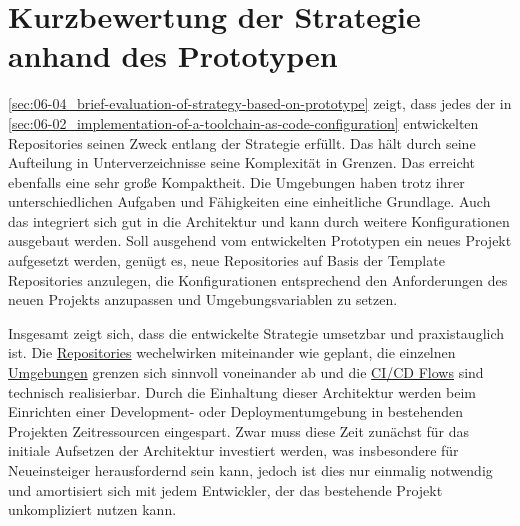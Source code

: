 \section{Kurzbewertung der Strategie anhand des Prototypen}
\label{sec:06-04_brief-evaluation-of-strategy-based-on-prototype}

\autoref{sec:06-04_brief-evaluation-of-strategy-based-on-prototype} zeigt, dass jedes der in \autoref{sec:06-02_implementation-of-a-toolchain-as-code-configuration} entwickelten Repositories seinen Zweck entlang der  Strategie erfüllt. Das  hält durch seine Aufteilung in Unterverzeichnisse seine Komplexität in Grenzen. Das  erreicht ebenfalls eine sehr große Kompaktheit. Die Umgebungen haben trotz ihrer unterschiedlichen Aufgaben und Fähigkeiten eine einheitliche Grundlage. Auch das  integriert sich gut in die Architektur und kann durch weitere Konfigurationen ausgebaut werden. Soll ausgehend vom entwickelten Prototypen ein neues Projekt aufgesetzt werden, genügt es, neue Repositories auf Basis der Template Repositories anzulegen, die Konfigurationen entsprechend den Anforderungen des neuen Projekts anzupassen und Umgebungsvariablen zu setzen.

Insgesamt zeigt sich, dass die entwickelte  Strategie umsetzbar und praxistauglich ist. Die \hyperref[subsubsec:05-02-02-01_data-storage-in-repositories]{Repositories} wechelwirken miteinander wie geplant, die einzelnen \hyperref[subsubsec:05-02-02-02_sub-components-in-environments]{Umgebungen} grenzen sich sinnvoll voneinander ab und die \hyperref[subsec:05-02-03_workflows-and-continuity-in-the-toolchain-as-code-approach]{CI/CD Flows} sind technisch realisierbar. Durch die Einhaltung dieser Architektur werden beim Einrichten einer Development- oder Deploymentumgebung in bestehenden Projekten Zeitressourcen eingespart. Zwar muss diese Zeit zunächst für das initiale Aufsetzen der Architektur investiert werden, was insbesondere für Neueinsteiger herausfordernd sein kann, jedoch ist dies nur einmalig notwendig und amortisiert sich mit jedem Entwickler, der das bestehende Projekt unkompliziert nutzen kann.

